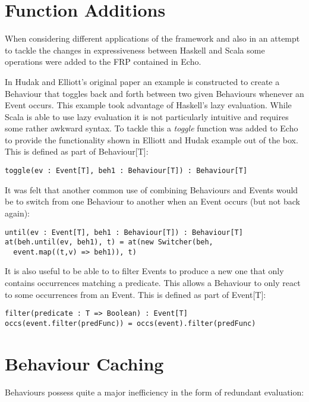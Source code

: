   \section{Function Additions}
    When considering different applications of the framework and also in an attempt to
    tackle the changes in expressiveness between Haskell and Scala some operations
    were added to the FRP contained in Echo.
    
    In Hudak and Elliott's original paper an example is constructed to create a Behaviour
    that toggles back and forth between two given Behaviours whenever an Event occurs. This
    example took advantage of Haskell's lazy evaluation. While Scala is able to use lazy evaluation
    it is not particularly intuitive and requires some rather awkward syntax. To tackle this
    a \emph{toggle} function was added to Echo to provide the functionality shown in Elliott and Hudak example out of the box.
    This is defined as part of Behaviour[T]:
    
\begin{verbatim}
toggle(ev : Event[T], beh1 : Behaviour[T]) : Behaviour[T]
\end{verbatim}        
    
    It was felt that another common use of combining Behaviours and Events would be
    to switch from one Behaviour to another when an Event occurs (but not back again):

\begin{verbatim}
until(ev : Event[T], beh1 : Behaviour[T]) : Behaviour[T]
at(beh.until(ev, beh1), t) = at(new Switcher(beh, 
  event.map((t,v) => beh1)), t)
\end{verbatim}        
    
    It is also useful to be able to to filter Events to produce a new one that only
    contains occurrences matching a predicate. This allows a Behaviour to only react
    to some occurrences from an Event. This is defined as part of Event[T]:

\begin{verbatim}
filter(predicate : T => Boolean) : Event[T]
occs(event.filter(predFunc)) = occs(event).filter(predFunc)
\end{verbatim}  

  \section{Behaviour Caching}
    Behaviours possess quite a major inefficiency in the form of redundant evaluation:

